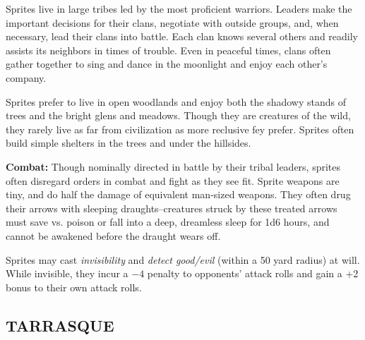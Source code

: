 \begin{multicols}{2}
Sprites live in large tribes led by the most proficient warriors. Leaders make the important decisions for their clans, negotiate with outside groups, and, when necessary, lead their clans into battle. Each clan knows several others and readily assists its neighbors in times of trouble. Even in peaceful times, clans often gather together to sing and dance in the moonlight and enjoy each other's company.

Sprites prefer to live in open woodlands and enjoy both the shadowy stands of trees and the bright glens and meadows. Though they are creatures of the wild, they rarely live as far from civilization as more reclusive fey prefer. Sprites often build simple shelters in the trees and under the hillsides.

\textbf{Combat:} Though nominally directed in battle by their tribal leaders, sprites often disregard orders in combat and fight as they see fit. Sprite weapons are tiny, and do half the damage of equivalent man-sized weapons. They often drug their arrows with sleeping draughts--creatures struck by these treated arrows must save vs. poison or fall into a deep, dreamless sleep for 1d6 hours, and cannot be awakened before the draught wears off.

Sprites may cast \textit{invisibility} and \textit{detect good/evil} (within a 50 yard radius) at will. While invisible, they incur a $-4$ penalty to opponents' attack rolls and gain a +2 bonus to their own attack rolls.

\noindent
\begin{minipage}{\columnwidth}

\vspace{1em}

\subsection{TARRASQUE}


\end{minipage}
\end{multicols}
